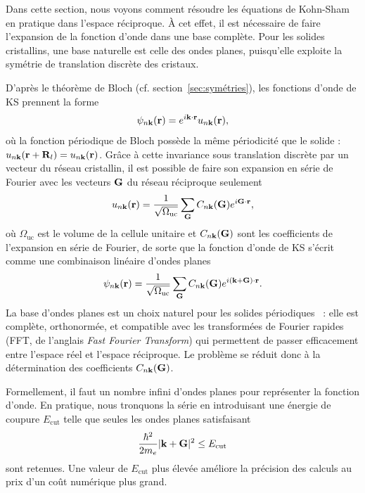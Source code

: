 Dans cette section, nous voyons comment résoudre les équations de Kohn-Sham en pratique dans l'espace réciproque. À cet effet, il est nécessaire de faire l'expansion de la fonction d'onde dans une base complète. Pour les solides cristallins, une base naturelle est celle des ondes planes, puisqu'elle exploite la symétrie de translation discrète des cristaux.

\bigskip
{}

D'après le théorème de Bloch (cf. section~\ref{sec:symétries}), les fonctions d'onde de KS prennent la forme
\begin{equation}
    \psi_{n\mathbf{k}}(\mathbf{r})=e^{i\mathbf{k}\cdot\mathbf{r}}u_{n\mathbf{k}}(\mathbf{r}),
    \label{eqn:c2_bloch_pt2}
\end{equation}
où la fonction périodique de Bloch possède la même périodicité que le solide : $u_{n\mathbf{k}}(\mathbf{r}+\mathbf{R}_l) = u_{n\mathbf{k}}(\mathbf{r})$. Grâce à cette invariance sous translation discrète par un vecteur du réseau cristallin, il est possible de faire son expansion en série de Fourier avec les vecteurs $\mathbf{G}$ du réseau réciproque seulement
\begin{equation}
    u_{n\mathbf{k}}(\mathbf{r})=\frac{1}{\sqrt{\Omega_\text{uc}}}\sum_{\mathbf{G}}C_{n\mathbf{k}}(\mathbf{G})e^{i\mathbf{G}\cdot\mathbf{r}},
    \label{eqn:c2_uPW}
\end{equation}
où $\Omega_\text{uc}$ est le volume de la cellule unitaire et $C_{n\mathbf{k}}(\mathbf{G})$ sont les coefficients de l'expansion en série de Fourier, de sorte que la fonction d'onde de KS s'écrit comme une combinaison linéaire d'ondes planes
\begin{equation}
    \psi_{n\mathbf{k}}(\mathbf{r})=\frac{1}{\sqrt{\Omega_\text{uc}}}\sum_{\mathbf{G}}C_{n\mathbf{k}}(\mathbf{G})e^{i(\mathbf{k}+\mathbf{G})\cdot\mathbf{r}}.
    \label{eqn:c2_psiPW}
\end{equation}
La base d'ondes planes est un choix naturel pour les solides périodiques~\cite{carUnifiedApproachMolecular1985,martinElectronicStructureBasic2004} : elle est complète, orthonormée, et compatible avec les transformées de Fourier rapides (FFT, de l'anglais \textit{Fast Fourier Transform}) qui permettent de passer efficacement entre l'espace réel et l'espace réciproque. Le problème se réduit donc à la détermination des coefficients $C_{n\mathbf{k}}(\mathbf{G})$.

Formellement, il faut un nombre infini d'ondes planes pour représenter la fonction d'onde. En pratique, nous tronquons la série en introduisant une énergie de coupure $E_\text{cut}$ telle que seules les ondes planes satisfaisant
\begin{equation}
    \frac{\hbar^2}{2m_e}|\mathbf{k}+\mathbf{G}|^2\leq E_\text{cut}
    \label{eqn:c2_Ecut}
\end{equation}
sont retenues. Une valeur de $E_\text{cut}$ plus élevée améliore la précision des calculs au prix d'un coût numérique plus grand.

